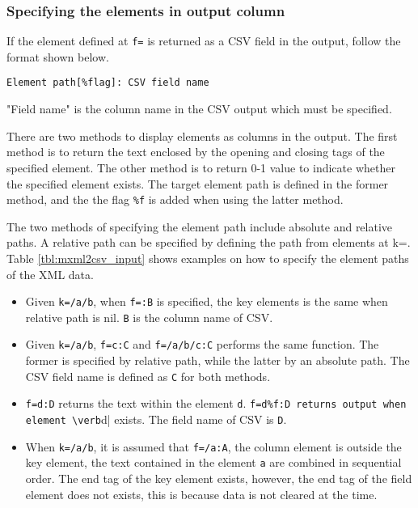 \subsubsection*{Specifying the elements in output column }
If the element defined at \verb|f=| is returned as a CSV field in the output, follow the format shown below. 

\verb|Element path[%flag]: CSV field name|

"Field name" is the column name in the CSV output which must be specified.

There are two methods to display elements as columns in the output.
The first method is to return the text enclosed by the opening and closing tags of the specified element.
The other method is to return 0-1 value to indicate whether the specified element exists.
The target element path is defined in the former method, and the the flag \verb|%f| is added when using the latter method.

The two methods of specifying the element path include absolute and relative paths. 
A relative path can be specified by defining the path from elements at k=.
Table \ref{tbl:mxml2csv_input} shows examples on how to specify the element paths of the XML data. 

\begin{itemize}
\item Given \verb|k=/a/b|, when \verb|f=:B| is specified, the key elements is the same when relative path is nil. \verb|B| is the column name of CSV.

\item Given \verb|k=/a/b|, \verb|f=c:C| and \verb|f=/a/b/c:C| performs the same function. The former is specified by relative path, while the latter by an absolute path. The CSV field name is defined as \verb|C| for both methods.

\item \verb|f=d:D| returns the text within the element \verb|d|.
\verb|f=d%f:D returns output when element \verb|d| exists. The field name of CSV is \verb|D|.

\item When \verb|k=/a/b|, it is assumed that \verb|f=/a:A|, the column element is outside the key element, the text contained in the element \verb|a| are combined in sequential order.
The end tag of the key element exists, however, the end tag of the field element does not exists, this is because data is not cleared at the time.
\end{itemize}

